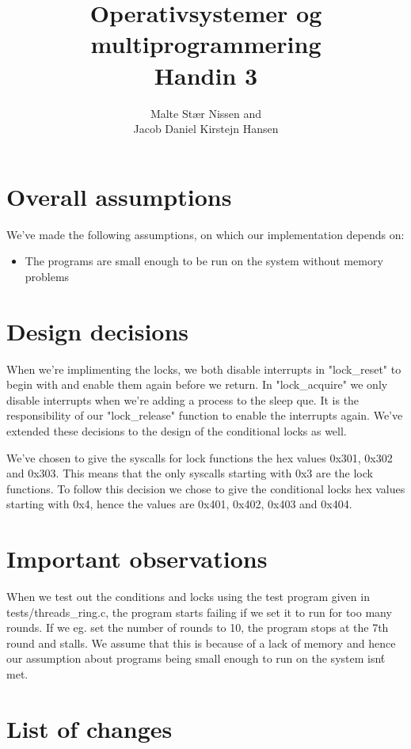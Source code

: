 \documentclass[11pt,a4paper]{article}
\title{Operativsystemer og multiprogrammering \\ Handin 3}
\author{Malte Stær Nissen and \\ 
        Jacob Daniel Kirstejn Hansen}
\begin{document}
\maketitle

\tableofcontents
\newpage

\section{Overall assumptions}
We've made the following assumptions, on which our implementation depends on: 

\begin{itemize}
\item The programs are small enough to be run on the system without memory problems
\end{itemize}

\section{Design decisions}

When we're implimenting the locks, we both disable interrupts in "lock\_reset"
to begin with and enable them again before we return. In "lock\_acquire" we
only disable interrupts when we're adding a process to the sleep que. It is the
responsibility of our "lock\_release" function to enable the interrupts again.
We've extended these decisions to the design of the conditional locks as well.

We've chosen to give the syscalls for lock functions the hex values 0x301, 0x302 and 0x303. This means that the only syscalls starting with 0x3 are the lock functions. To follow this decision we chose to give the conditional locks hex values starting with 0x4, hence the values are 0x401, 0x402, 0x403 and 0x404.

\section{Important observations}
When we test out the conditions and locks using the test program given in tests/threads\_ring.c, the program starts failing if we set it to run for too many rounds. If we eg. set the number of rounds to 10, the program stops at the 7th round and stalls. We assume that this is because of a lack of memory and hence our assumption about programs being small enough to run on the system isn\'t met.

\section{List of changes}
\end{document}
